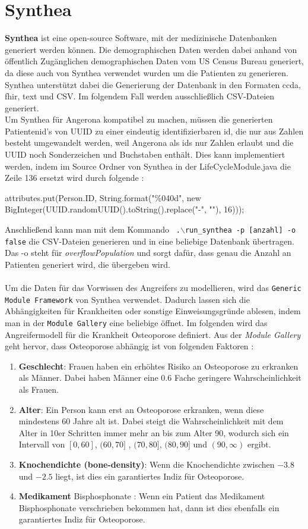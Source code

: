 \documentclass[german,version-2020-11]{uzl-thesis}
\begin{document}
\section{Synthea}
\textbf{Synthea} \cite{19,20} ist eine open-source Software, mit der medizinische Datenbanken generiert werden können. Die demographischen Daten werden dabei anhand von öffentlich Zugänglichen demographischen Daten vom US Census Bureau \cite{21} generiert, da diese auch von Synthea verwendet wurden um die Patienten zu generieren. Synthea unterstützt dabei die Generierung der Datenbank in den Formaten ccda, fhir, text und CSV. Im folgendem Fall werden ausschließlich CSV-Dateien generiert.\\  Um Synthea für Angerona kompatibel zu machen, müssen die generierten Patientenid's von UUID zu einer eindeutig identifizierbaren id, die nur aus Zahlen besteht umgewandelt werden, weil Angerona als ids nur Zahlen erlaubt und die UUID noch Sonderzeichen und Buchstaben enthält. Dies kann implementiert werden, indem im Source Ordner von Synthea in der LifeCycleModule.java die Zeile 136 ersetzt wird durch folgende : 
\begin{Java}
    attributes.put(Person.ID, String.format("\%040d", new BigInteger(UUID.randomUUID().toString().replace("-", ""), 16)));
\end{Java}
Anschließend kann man mit dem Kommando \texttt{ .$\backslash$run\_synthea -p [anzahl] -o false} die CSV-Dateien generieren und in eine beliebige Datenbank übertragen. Das -o steht für \textit{\textit{overflowPopulation}} und sorgt dafür, dass genau die Anzahl an Patienten generiert wird, die übergeben wird. \\ \\
Um die Daten für das Vorwissen des Angreifers zu modellieren, wird das \texttt{Generic Module Framework} von Synthea verwendet. Dadurch lassen sich die Abhängigkeiten für Krankheiten oder sonstige  Einweisungsgründe ablesen, indem man in der \texttt{Module Gallery}\cite{22} eine beliebige öffnet. Im folgenden  wird das Angreifermodell für die Krankheit Osteoporose definiert.  
Aus der \textit{Module Gallery} geht hervor, dass Osteoporose abhängig ist von folgenden Faktoren : 
\begin{enumerate}
	\item \textbf{Geschlecht}: Frauen haben ein erhöhtes Risiko an Osteoporose zu erkranken als Männer. Dabei haben Männer eine $0.6$ Fache geringere Wahrscheinlichkeit als Frauen.
	\item \textbf{Alter}: Ein Person kann erst an Osteoporose erkranken, wenn diese mindestens 60 Jahre alt ist. Dabei steigt die Wahrscheinlichkeit mit dem Alter in 10er Schritten immer mehr an bis zum Alter 90, wodurch sich ein Intervall von $[0,60]$, $(60,70]$ , $(70,80]$, $(80,90]$ und $(90,\infty)$ ergibt.
	\item \textbf{Knochendichte (bone-density)}: Wenn die Knochendichte zwischen $-3.8$ und $-2.5$ liegt, ist dies ein garantiertes Indiz für Osteoporose.
	\item \textbf{Medikament} Bisphosphonate : Wenn ein Patient das Medikament Bisphosphonate verschrieben bekommen hat, dann ist dies ebenfalls ein garantiertes Indiz für Osteoporose.
\end{enumerate} 
\end{document}
